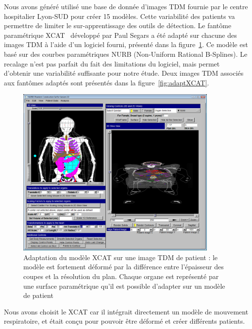 Nous avons généré utilisé une base de donnée d’images TDM fournie par le centre hospitalier Lyon-SUD pour créer 15 modèles. Cette variabilité des patients va permettre de limiter le sur-apprentissage des outils de détection. Le fantôme paramétrique XCAT~\cite{segars2009mcatoverview} développé par Paul Segars a été adapté  sur chacune des images TDM à l’aide d’un logiciel fourni, présenté dans la figure~\ref{fig:fitXCAT}. Ce modèle est basé sur des courbes paramétriques NURB (Non-Uniform Rational B-Splines). Le recalage n’est pas parfait du fait des limitations du logiciel, mais permet d’obtenir une variabilité suffisante pour notre étude. Deux images TDM associés aux fantômes adaptés sont présentés dans la figure~\ref{fig:adaptXCAT}.

\begin{figure}
 \centering
 \includegraphics[width=10cm]{images/FIT_XCAT}
 \caption[Adaptation du modèle XCAT sur une image TDM de patient]{Adaptation du modèle XCAT sur une image TDM de patient : le modèle est fortement déformé par la différence entre l'épaisseur des coupes et la résolution du plan. Chaque organe est représenté par une surface paramétrique qu’il est possible d’adapter sur un modèle de patient}
 \label{fig:fitXCAT}
\end{figure}
Nous avons choisit le XCAT car il intégrait directement un modèle de mouvement respiratoire, et était conçu pour pouvoir être déformé et créer différents patients.

